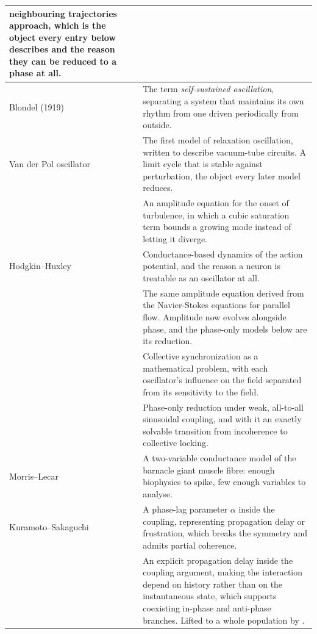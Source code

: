 \documentclass[10pt]{article}
\begin{document}
\begin{longtable}[]{@{}
  >{\raggedright\arraybackslash}p{}
  >{\raggedright\arraybackslash}p{}@{}}
neighbouring trajectories approach, which is the object every entry
below describes and the reason they can be reduced to a phase at all. \\
\cmidrule{1-2}Blondel (1919) & The term \emph{self-sustained
oscillation}, separating a system that maintains its own rhythm from one
driven periodically from outside. \\
\cmidrule{1-2}Van der Pol oscillator \citep{vanderpol1926} & The first
model of relaxation oscillation, written to describe vacuum-tube
circuits. A limit cycle that is stable against perturbation, the object
every later model reduces. \\
\cmidrule{1-2}\citet{landau1944} & An amplitude equation for the onset
of turbulence, in which a cubic saturation term bounds a growing mode
instead of letting it diverge. \\
\cmidrule{1-2}Hodgkin--Huxley \citep{hodgkin1952} & Conductance-based
dynamics of the action potential, and the reason a neuron is treatable
as an oscillator at all. \\
\cmidrule{1-2}\citet{stuart1960} & The same amplitude equation derived
from the Navier-Stokes equations for parallel flow. Amplitude now
evolves alongside phase, and the phase-only models below are its
reduction. \\
\cmidrule{1-2}\citet{winfree1967} & Collective synchronization as a
mathematical problem, with each oscillator's influence on the field
separated from its sensitivity to the field. \\
\cmidrule{1-2}\citet{kuramoto1975} & Phase-only reduction under weak,
all-to-all sinusoidal coupling, and with it an exactly solvable
transition from incoherence to collective locking. \\
\cmidrule{1-2}Morris--Lecar \citep{morris1981} & A two-variable
conductance model of the barnacle giant muscle fibre: enough biophysics
to spike, few enough variables to analyse. \\
\cmidrule{1-2}Kuramoto--Sakaguchi \citep{sakaguchi1986} & A phase-lag
parameter \ensuremath{\alpha} inside the coupling, representing
propagation delay or frustration, which breaks the symmetry and admits
partial coherence. \\
\cmidrule{1-2}\citet{schuster1989} & An explicit propagation delay
inside the coupling argument, making the interaction depend on history
rather than on the instantaneous state, which supports coexisting
in-phase and anti-phase branches. Lifted to a whole population by
\citet{yeung1999}. \\

\end{longtable}
\end{document}
